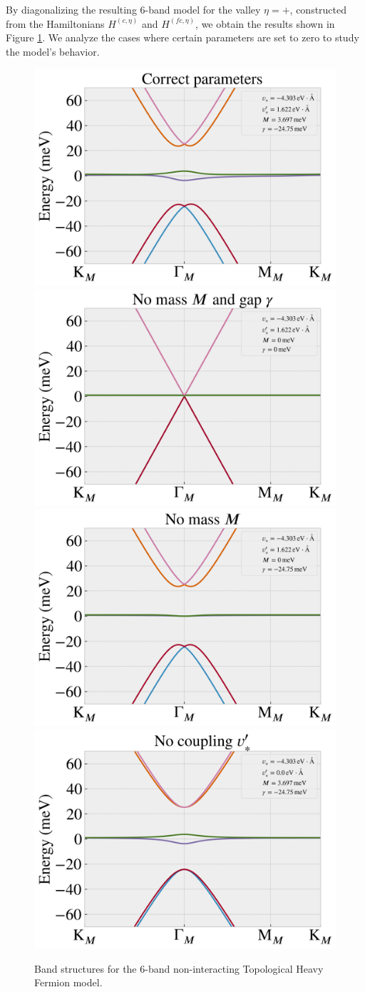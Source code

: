 \documentclass[12pt]{report}
\begin{document}
By diagonalizing the resulting 6-band model for the valley $\eta = +$, constructed from the Hamiltonians $H^{(c,\eta)}$ and $H^{(fc,\eta)}$, we obtain the results shown in Figure \ref{fig:thf-exploration}. We analyze the cases where certain parameters are set to zero to study the model's behavior.

\begin{figure}[H]
\centering
\includegraphics[height=0.35\linewidth]{fig/thf-correct_params.png}
\includegraphics[height=0.35\linewidth]{fig/thf-no_M_no_gamma.png}
\includegraphics[height=0.35\linewidth]{fig/thf-no_M.png}
\includegraphics[height=0.35\linewidth]{fig/thf-no_coupling.png}
\caption{Band structures for the 6-band non-interacting Topological Heavy Fermion model.}
\label{fig:thf-exploration}
\end{figure}
\end{document}
